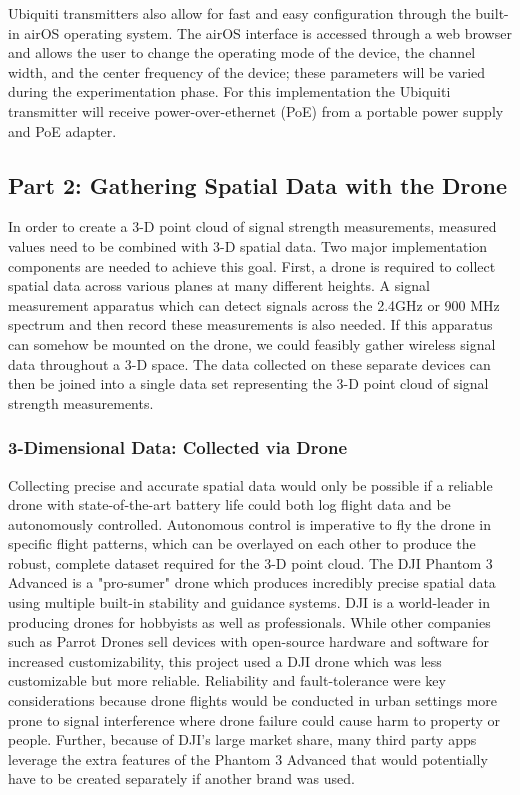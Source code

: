 \documentclass[pageno]{jpaper}
\begin{document}
Ubiquiti transmitters also allow for fast and easy configuration through the built-in airOS operating system. The airOS interface is accessed through a web browser and allows the user to change the operating mode of the device, the channel width, and the center frequency of the device; these parameters will be varied during the experimentation phase. For this implementation the Ubiquiti transmitter will receive power-over-ethernet (PoE) from a portable power supply and PoE adapter.

\subsection{Part 2: Gathering Spatial Data with the Drone}
In order to create a 3-D point cloud of signal strength measurements, measured values need to be combined with 3-D spatial data. Two major implementation components are needed to achieve this goal. First, a drone is required to collect spatial data across various planes at many different heights. A signal measurement apparatus which can detect signals  across the 2.4GHz or 900 MHz spectrum and then record these measurements is also needed. If this apparatus can somehow be mounted on the drone, we could feasibly gather wireless signal data throughout a 3-D space. The data collected on these separate devices  can then be joined into a single data set representing the 3-D point cloud of signal strength measurements. 

\subsubsection{3-Dimensional Data: Collected via Drone}
Collecting precise and accurate spatial data would only be possible if a reliable  drone with state-of-the-art battery life could both log flight data and be autonomously controlled. Autonomous control is imperative to fly the drone in specific flight patterns, which can be overlayed on each other to produce the robust, complete dataset required for the 3-D point cloud. The DJI Phantom 3 Advanced is a "pro-sumer" drone which produces incredibly precise spatial data using multiple built-in stability and guidance systems. DJI is a world-leader in producing drones for hobbyists as well as professionals. While other companies such as Parrot Drones sell devices with open-source hardware and software for increased customizability, this project used a DJI drone which was less customizable but more reliable. Reliability and fault-tolerance were key considerations because drone flights would be conducted in urban settings more prone to signal interference where drone failure could cause harm to property or people. Further, because of DJI's large market share, many third party apps leverage the extra features of the Phantom 3 Advanced that would potentially have to be created separately if another brand was used. 
\end{document}
